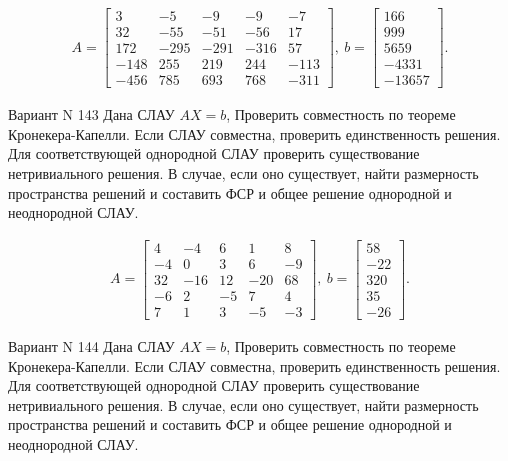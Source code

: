 \documentclass[11pt]{report}
\begin{document}
\begin{align*}
 A = \left[\begin{matrix}3 & -5 & -9 & -9 & -7\\32 & -55 & -51 & -56 & 17\\172 & -295 & -291 & -316 & 57\\-148 & 255 & 219 & 244 & -113\\-456 & 785 & 693 & 768 & -311\end{matrix}\right],
\ b = \left[\begin{matrix}166\\999\\5659\\-4331\\-13657\end{matrix}\right]. 
 \end{align*}

Вариант N 143
Дана СЛАУ $AX = b$,
Проверить совместность по теореме Кронекера-Капелли. Если СЛАУ совместна, проверить единственность решения.
Для соответствующей однородной СЛАУ проверить существование нетривиального решения. В случае, если оно существует,
найти размерность пространства решений и составить ФСР и общее решение однородной  и неоднородной СЛАУ.


\begin{align*}
 A = \left[\begin{matrix}4 & -4 & 6 & 1 & 8\\-4 & 0 & 3 & 6 & -9\\32 & -16 & 12 & -20 & 68\\-6 & 2 & -5 & 7 & 4\\7 & 1 & 3 & -5 & -3\end{matrix}\right],
\ b = \left[\begin{matrix}58\\-22\\320\\35\\-26\end{matrix}\right]. 
 \end{align*}

Вариант N 144
Дана СЛАУ $AX = b$,
Проверить совместность по теореме Кронекера-Капелли. Если СЛАУ совместна, проверить единственность решения.
Для соответствующей однородной СЛАУ проверить существование нетривиального решения. В случае, если оно существует,
найти размерность пространства решений и составить ФСР и общее решение однородной  и неоднородной СЛАУ.
\end{document}
